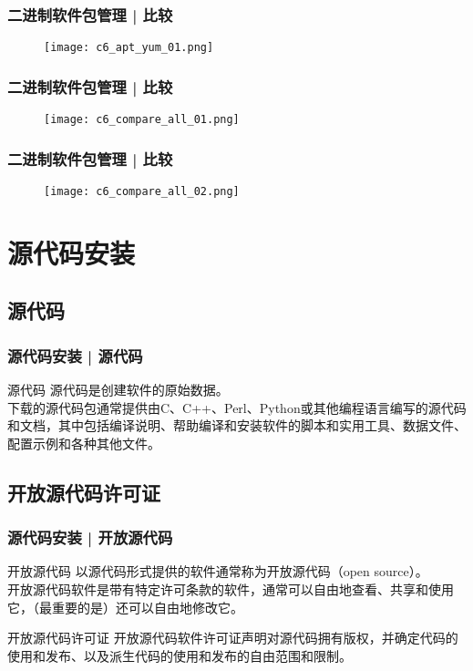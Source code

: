 \begin{frame}
  \frametitle{二进制软件包管理 | 比较}
  \begin{figure}
    \centering
    \texttt{[image: c6\_apt\_yum\_01.png]}
  \end{figure}
\end{frame}

\begin{frame}
  \frametitle{二进制软件包管理 | 比较}
  \begin{figure}
    \centering
    \texttt{[image: c6\_compare\_all\_01.png]}
  \end{figure}
\end{frame}

\begin{frame}
  \frametitle{二进制软件包管理 | 比较}
  \begin{figure}
    \centering
    \texttt{[image: c6\_compare\_all\_02.png]}
  \end{figure}
\end{frame}

\section{源代码安装}
\subsection{源代码}
\begin{frame}
  \frametitle{源代码安装 | 源代码}
  \begin{block}{源代码}
    源代码是创建软件的原始数据。\\
    下载的源代码包通常提供由C、C++、Perl、Python或其他编程语言编写的源代码和文档，其中包括编译说明、帮助编译和安装软件的脚本和实用工具、数据文件、配置示例和各种其他文件。
  \end{block}
\end{frame}

\subsection{开放源代码许可证}
\begin{frame}
  \frametitle{源代码安装 | 开放源代码}
  \begin{block}{开放源代码}
    以源代码形式提供的软件通常称为开放源代码（open source）。\\
    开放源代码软件是带有特定许可条款的软件，通常可以自由地查看、共享和使用它，（最重要的是）还可以自由地修改它。
  \end{block}
  \pause
  \begin{block}{开放源代码许可证}
    开放源代码软件许可证声明对源代码拥有版权，并确定代码的使用和发布、以及派生代码的使用和发布的自由范围和限制。
  \end{block}
\end{frame}

